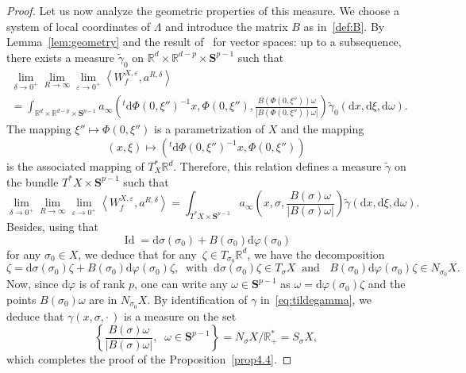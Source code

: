 \documentclass[10pt]{amsart}
\theoremstyle{definition}
\DeclareMathOperator{\Id}{Id}
\newcommand*\R{{\mathbb R}}
\newcommand*\eps{\varepsilon}
\numberwithin{equation}{section}
\newcommand*{\dd}{\mathrm{d}}
\newcommand*{\dx}{\dd x}
\newcommand*{\dxi}{\dd \xi}
\newcommand*{\dsigma}{\dd \sigma}
\newcommand*{\domega}{\dd \omega}
\newcommand*{\dphi}{\dd \varphi}
\newcommand*{\dPhi}{\dd \Phi} %
\begin{document}
\begin{proof}
Let us now analyze the geometric properties of this measure. We choose a system of local coordinates of $\Lambda$ and introduce the matrix $B$ as in~\eqref{def:B}. By Lemma~\ref{lem:geometry} and the result of~\cite{CFMProc} for vector spaces: up to a subsequence, there exists a measure $\widetilde\gamma_0$ on $\R^d\times \R^{d-p} \times \mathbf{S}^{p-1}$ such that
\begin{multline*}
\lim_{\delta\to 0^+}\lim_{R\to\infty} \lim_{\eps\to 0^+}\left\langle W^{X,\eps}_{f},a^{R,\delta}\right\rangle\\
=
\int_{\R^d\times \R^{d-p} \times \mathbf{S}^{p-1}} a_\infty\left(^t \dPhi (0,\xi'')^{-1} x,\Phi(0,\xi''),\frac{B\left(\Phi(0,\xi'')\right) \omega}{|B\left(\Phi(0,\xi'')\right) \omega |}\right)\widetilde\gamma_0(\dx,\dxi,\domega).
\end{multline*}
The mapping $\xi''\mapsto \Phi(0,\xi'')$ is a parametrization of $X$ and the mapping
\[
(x,\xi)\mapsto \left(^t \dPhi (0,\xi'')^{-1} x,\Phi(0,\xi'')\right)
\]
is the associated mapping of $T^*_X\R^d$. Therefore, this relation defines a measure $\widetilde\gamma$ on the bundle $T^*X\times \mathbf{S}^{p-1}$ such that
\begin{equation}\label{eq:tildegamma}
\lim_{\delta\to 0^+}\lim_{R\to\infty} \lim_{\eps\to 0^+}\left\langle W^{X,\eps}_{f},a^{R,\delta}\right\rangle =
\int_{T^*X\times \mathbf{S}^{p-1}} a_\infty\left(x,\sigma,\frac{B\left(\sigma\right) \omega}{|B\left(\sigma\right) \omega |}\right)\widetilde\gamma(\dx,\dxi,\domega).
\end{equation}
Besides, using that
\begin{equation}\label{dsigma}
{\Id} = \dsigma(\sigma_0) + B(\sigma_0) \dphi(\sigma_0)
\end{equation}
for any $\sigma_0\in X$, we deduce that for any~$\zeta\in T_{\sigma_0}\R^d$, we have the decomposition
\[
\zeta= \dsigma(\sigma_0) \zeta + B(\sigma_0) \dphi(\sigma_0)\zeta,\;\;\text{with}\;\;\dsigma(\sigma_0) \zeta \in T_\sigma X\;\;\text{and }\;\;B(\sigma_0) \dphi(\sigma_0)\zeta\in N_{\sigma_0} X.
\]
Now, since $\dphi$ is of rank $p$, one can write any $\omega\in \mathbf{S}^{p-1}$ as $\omega=\dphi(\sigma_0)\zeta$ and the points $B(\sigma_0)\omega$ are in $N_{\sigma_0} X$. By identification of $\gamma$ in~\eqref{eq:tildegamma}, we deduce that $\gamma(x,\sigma,\cdot\,)$ is a measure on the set
\[
\left\{ \frac{B\left(\sigma\right) \omega}{|B\left(\sigma\right) \omega |},\;\;\omega\in \mathbf{S}^{p-1}\right\}= {N_\sigma X}/{\R^*_+}=S_\sigma X,
\]
which completes the proof of the Proposition~\ref{prop4.4}.
\end{proof}
\end{document}
